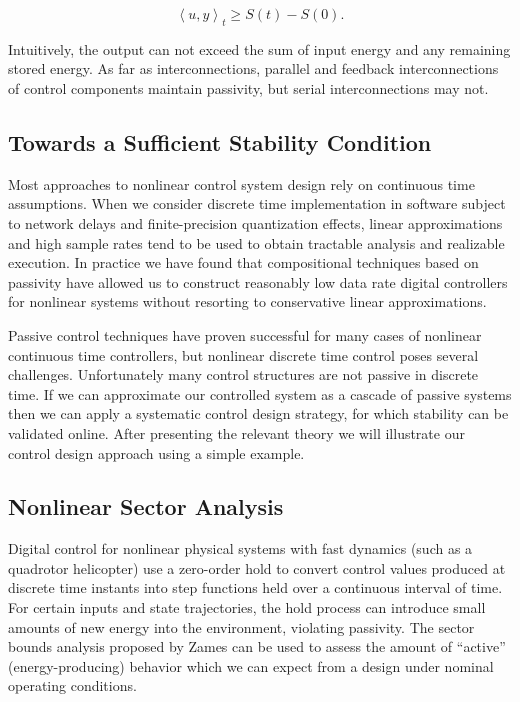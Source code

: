 \begin{equation}
 \left \langle u,y \right \rangle_t \geq S(t) - S(0).
\end{equation}

Intuitively, the output can not exceed the sum of input energy and any remaining stored energy.
As far as interconnections, parallel and feedback interconnections of control components maintain
passivity, but serial interconnections may not.

\subsection{Towards a Sufficient Stability Condition}

Most approaches to nonlinear control system design rely on continuous time assumptions.  When we 
consider discrete time implementation in software subject to network delays and finite-precision 
quantization effects, linear approximations and high sample rates tend to be used to obtain 
tractable analysis and realizable execution.  In practice we have found that compositional techniques 
based on passivity have allowed us to construct reasonably low data rate digital controllers for 
nonlinear systems without resorting to conservative linear approximations. 

Passive control techniques have proven successful for many cases of nonlinear continuous time 
controllers, but nonlinear discrete time control poses several challenges.  Unfortunately many 
control structures are not passive in discrete time.  If we can approximate our controlled system 
as a cascade of passive systems then we can apply a systematic control design strategy, for 
which stability can be validated online.  After presenting the relevant
theory we will illustrate our control design approach using a simple example.

\subsection{Nonlinear Sector Analysis}

Digital control for nonlinear physical systems with fast dynamics (such as a quadrotor helicopter) 
use a zero-order hold to convert control values produced at discrete time instants into step 
functions held over a continuous interval of time.  For certain inputs and state trajectories, the 
hold process can introduce small amounts of new energy into the environment, violating passivity.  
The sector bounds analysis proposed by Zames \cite{control:sectors1} can be used to assess the 
amount of ``active'' (energy-producing) behavior which we can expect from a design under nominal 
operating conditions.

